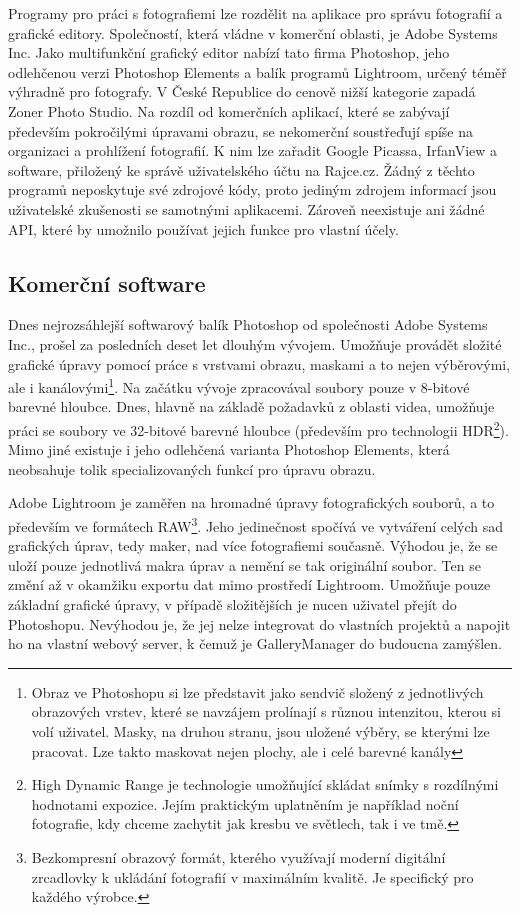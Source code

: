 \documentclass[11pt,twoside,a4paper]{book}
\begin{document}
\indent
Programy pro práci s fotografiemi lze rozdělit na aplikace pro správu fotografií a grafické editory. Společností, která vládne v komerční oblasti, je Adobe Systems Inc. Jako multifunkční grafický editor nabízí tato firma Photoshop, jeho odlehčenou verzi Photoshop Elements a balík programů Lightroom, určený téměř výhradně pro fotografy. V České Republice do cenově nižší kategorie zapadá Zoner Photo Studio. Na rozdíl od komerčních aplikací, které se zabývají především pokročilými úpravami obrazu, se nekomerční soustřeďují spíše na organizaci a prohlížení fotografií. K nim lze zařadit Google Picassa, IrfanView a software, přiložený ke správě uživatelského účtu na Rajce.cz. Žádný z těchto programů neposkytuje své zdrojové kódy, proto jediným zdrojem informací jsou uživatelské zkušenosti se samotnými aplikacemi. Zároveň neexistuje ani žádné API, které by umožnilo používat jejich funkce pro vlastní účely.

\subsection{Komerční software}
\noindent
Dnes nejrozsáhlejší softwarový balík Photoshop od společnosti Adobe Systems Inc., prošel za posledních deset let dlouhým vývojem. Umožňuje provádět složité grafické úpravy pomocí práce s vrstvami obrazu, maskami a to nejen výběrovými, ale i kanálovými\footnote{Obraz ve Photoshopu si lze představit jako sendvič složený z jednotlivých obrazových vrstev, které se navzájem prolínají s různou intenzitou, kterou si volí uživatel. Masky, na druhou stranu, jsou uložené výběry, se kterými lze pracovat. Lze takto maskovat nejen plochy, ale i celé barevné kanály}. Na začátku vývoje zpracovával soubory pouze v 8-bitové barevné hloubce. Dnes, hlavně na základě požadavků z oblasti videa, umožňuje práci se soubory ve 32-bitové barevné hloubce (především pro technologii HDR\footnote{High Dynamic Range je technologie umožňující skládat snímky s rozdílnými hodnotami expozice. Jejím praktickým uplatněním je například noční fotografie, kdy chceme zachytit jak kresbu ve světlech, tak i ve tmě.}). Mimo jiné existuje i jeho odlehčená varianta Photoshop Elements, která neobsahuje tolik specializovaných funkcí pro úpravu obrazu.

\indent
Adobe Lightroom je zaměřen na hromadné úpravy fotografických souborů, a to především ve formátech RAW\footnote{Bezkompresní obrazový formát, kterého využívají moderní digitální zrcadlovky k ukládání fotografií v maximálním kvalitě. Je specifický pro každého výrobce.}. Jeho jedinečnost spočívá ve vytváření celých sad grafických úprav, tedy maker, nad více fotografiemi současně. Výhodou je, že se uloží pouze jednotlivá makra úprav a nemění se tak originální soubor. Ten se změní až v okamžiku exportu dat mimo prostředí Lightroom. Umožňuje pouze základní grafické úpravy, v případě složitějších je nucen uživatel přejít do Photoshopu. Nevýhodou je, že jej nelze integrovat do vlastních projektů a napojit ho na vlastní webový server, k čemuž je GalleryManager do budoucna zamýšlen.
\end{document}
